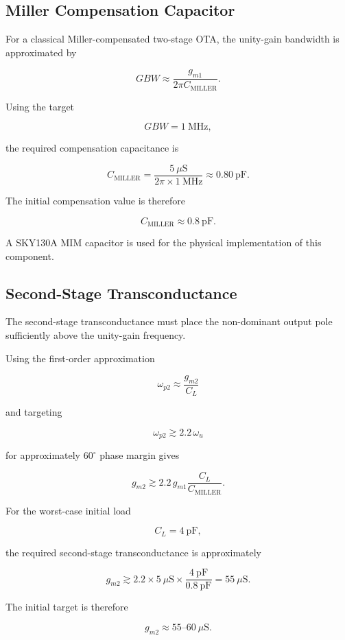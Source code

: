 \subsection{Miller Compensation Capacitor}

For a classical Miller-compensated two-stage OTA, the unity-gain bandwidth
is approximated by

\[
GBW
\approx
\frac{g_{m1}}
     {2\pi C_{\mathrm{MILLER}}}.
\]

Using the target

\[
GBW = 1~\mathrm{MHz},
\]

the required compensation capacitance is

\[
C_{\mathrm{MILLER}}
=
\frac{5~\mu\mathrm{S}}
     {2\pi \times 1~\mathrm{MHz}}
\approx
0.80~\mathrm{pF}.
\]

The initial compensation value is therefore

\[
\boxed{
C_{\mathrm{MILLER}}
\approx
0.8~\mathrm{pF}
}.
\]

A SKY130A MIM capacitor is used for the physical implementation of this
component.


\subsection{Second-Stage Transconductance}

The second-stage transconductance must place the non-dominant output pole
sufficiently above the unity-gain frequency.

Using the first-order approximation

\[
\omega_{p2}
\approx
\frac{g_{m2}}{C_L}
\]

and targeting

\[
\omega_{p2}
\gtrsim
2.2\,\omega_u
\]

for approximately $60^\circ$ phase margin gives

\[
g_{m2}
\gtrsim
2.2\,
g_{m1}
\frac{C_L}
     {C_{\mathrm{MILLER}}}.
\]

For the worst-case initial load

\[
C_L = 4~\mathrm{pF},
\]

the required second-stage transconductance is approximately

\[
g_{m2}
\gtrsim
2.2
\times
5~\mu\mathrm{S}
\times
\frac{4~\mathrm{pF}}
     {0.8~\mathrm{pF}}
=
55~\mu\mathrm{S}.
\]

The initial target is therefore

\[
\boxed{
g_{m2}
\approx
55\text{--}60~\mu\mathrm{S}
}.
\]


